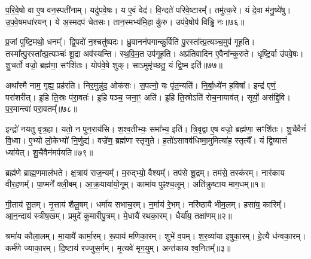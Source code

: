 प॒रि॒वे॒षो वा ए॒ष वन॒स्पती॑नाम्।
यदु॑पवे॒षः।
य ए॒वं वेद॑।
वि॒न्दते॑ परिवे॒ष्टारम्᳚।
तमु॑त्क॒रे।
यं दे॒वा म॑नु॒ष्ये॑षु।
उ॒प॒वे॒षमधा॑रयन्।
ये अ॒स्मदप॑ चेतसः।
तान॒स्मभ्य॑मि॒हा कु॑रु।
उप॑वे॒षोप॑ विड्ढि नः॥७६॥\ip

प्र॒जां पुष्टि॒मथो॒ धनम्᳚।
द्वि॒पदो॑ न॒श्चतु॑ष्पदः।
ध्रु॒वानन॑प\-गान्कु॒र्विति॑ पु॒रस्ता᳚त्प्र॒त्यञ्च॒मुप॑ गूहति।
तस्मा᳚त्पु॒र\-स्ता᳚त्प्र॒त्यञ्चः॑ शू॒द्रा अव॑स्यन्ति।
स्थ॒वि॒म॒त उप॑गूहति।
अप्र॑तिवादिन ए॒वैना᳚न्कुरुते।
धृष्टि॒र्वा उ॑पवे॒षः।
शु॒चर्तो वज्रो॒ ब्रह्म॑णा॒ सꣳशि॑तः।
योप॑वे॒षे शुक्।
साऽमुमृ॑च्छतु॒ यं द्वि॒ष्म इति॑॥७७॥\ip

अथा᳚स्मै नाम॒ गृह्य॒ प्रह॑रति।
निर॒मुन्नु॑द॒ ओक॑सः।
स॒पत्नो॒ यः पृ॑त॒न्यति॑।
नि॒र्बा॒ध्ये॑न ह॒विषा᳚।
इन्द्र॑ एणं॒ परा॑शरीत्।
इ॒हि ति॒स्रः प॑रा॒वतः॑।
इ॒हि पञ्च॒ जना॒ꣳ॒ अति॑।
इ॒हि ति॒स्रोऽति॑ रोच॒नायाव॑त्।
सूर्यो॒ अस॑द्दि॒वि।
प॒र॒मान्त्वा॑ परा॒वतम्᳚॥७८॥\ip

इन्द्रो॑ नयतु वृत्र॒हा।
यतो॒ न पुन॒राय॑सि।
श॒श्व॒तीभ्यः॒ समा᳚भ्य॒ इति॑।
त्रि॒वृद्वा ए॒ष वज्रो॒ ब्रह्म॑णा॒ सꣳशि॑तः।
शु॒चैवैनं॑ वि॒ध्वा।
ए॒भ्यो लो॒केभ्यो॑ नि॒र्णुद्य॑।
वज्रे॑ण॒ ब्रह्म॑णा स्तृणुते।
ह॒तो॑\-ऽसावव॑धिष्मा॒मुमित्या॑ह॒ स्तृत्यै᳚।
यं द्वि॒ष्यात्तं ध्या॑येत्।
शु॒चैवैन॑मर्पयति॥७९॥\ip


\clearpage
{}
\setcounter{anuvakam}{0}

ब्रह्म॑णे ब्राह्म॒णमाल॑भते।
क्ष॒त्राय॑ राज॒न्यम्᳚।
म॒रुद्भ्यो॒ वैश्यम्᳚।
तप॑से शू॒द्रम्।
तम॑से॒ तस्क॑रम्।
नार॑काय वीर॒हणम्᳚।
पा॒प्मने᳚ क्ली॒बम्।
आ॒क्र॒याया॑यो॒गूम्।
कामा॑य पुꣴश्च॒लूम्।
अति॑क्रुष्टाय माग॒धम्॥१॥\ip

गी॒ताय॑ सू॒तम्।
नृ॒त्ताय॑ शैलू॒षम्।
धर्मा॑य सभाच॒रम्।
न॒र्माय॑ रे॒भम्।
नरि॑ष्ठायै भीम॒लम्।
हसा॑य॒ कारिम्᳚।
आ॒न॒न्दाय॑ स्त्रीष॒खम्।
प्रमुदे॑ कुमारीपु॒त्रम्।
मे॒धायै॑ रथका॒रम्।
धैर्या॑य॒ तक्षा॑णम्॥२॥\ip

श्रमा॑य कौला॒लम्।
मा॒यायै॑ कार्मा॒रम्।
रू॒पाय॑ मणिका॒रम्।
शुभे॑ व॒पम्।
श॒र॒व्या॑या इषुका॒रम्।
हे॒त्यै ध॑न्वका॒रम्।
कर्म॑णे ज्या\-का॒रम्।
दि॒ष्टाय॑ रज्जुस॒र्गम्।
मृ॒त्यवे॑ मृग॒युम्।
अन्त॑काय श्व॒नितम्᳚॥३॥\ip

